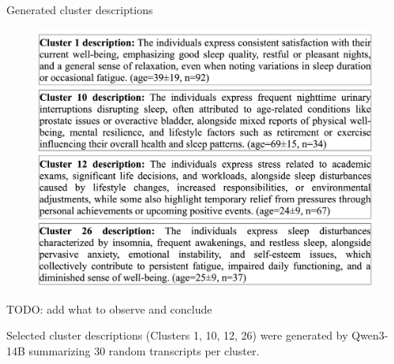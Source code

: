 \documentclass[handout,10pt]{beamer}
\begin{document}
\begin{frame}{Generated cluster descriptions}
  \begin{figure}
    \centering
    \includegraphics[scale=0.25]{img/topic_modeling/boxplot_description/popgen_description_larger_descriptions.png}
    \label{fig:popgen_description}
\end{figure}

TODO: add what to observe and conclude

Selected cluster descriptions (Clusters 1, 10, 12, 26) were generated by Qwen3-14B summarizing 30 random transcripts per cluster.
\end{frame}
\end{document}
